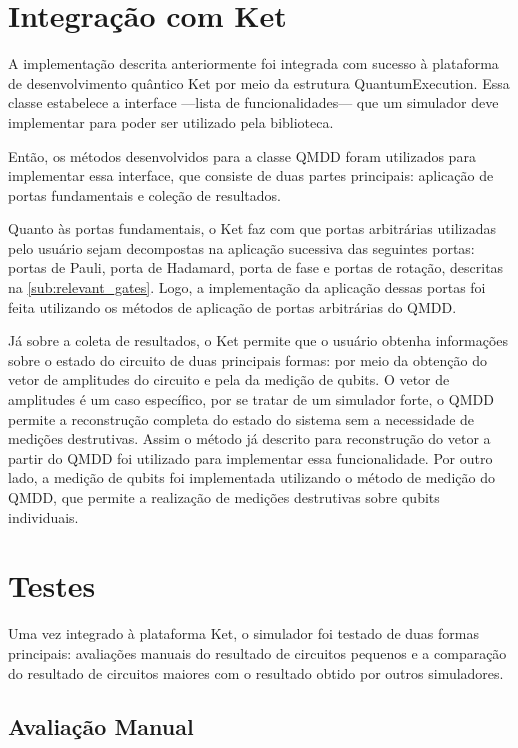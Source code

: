 \section{Integração com Ket}\label{sec:ket}

A implementação descrita anteriormente foi integrada com sucesso à plataforma de desenvolvimento quântico Ket por meio da estrutura QuantumExecution. Essa classe estabelece a interface ---lista de funcionalidades--- que um simulador deve implementar para poder ser utilizado pela biblioteca.

Então, os métodos desenvolvidos para a classe QMDD foram utilizados para implementar essa interface, que consiste de duas partes principais: aplicação de portas fundamentais e coleção de resultados.

Quanto às portas fundamentais, o Ket faz com que portas arbitrárias utilizadas pelo usuário sejam decompostas na aplicação sucessiva das seguintes portas: portas de Pauli, porta de Hadamard, porta de fase e portas de rotação, descritas na \cref{sub:relevant_gates}. Logo, a implementação da aplicação dessas portas foi feita utilizando os métodos de aplicação de portas arbitrárias do QMDD.

Já sobre a coleta de resultados, o Ket permite que o usuário obtenha informações sobre o estado do circuito de duas principais formas: por meio da obtenção do vetor de amplitudes do circuito e pela da medição de qubits. O vetor de amplitudes é um caso específico, por se tratar de um simulador forte, o QMDD permite a reconstrução completa do estado do sistema sem a necessidade de medições destrutivas. Assim o método já descrito para reconstrução do vetor a partir do QMDD foi utilizado para implementar essa funcionalidade. Por outro lado, a medição de qubits foi implementada utilizando o método de medição do QMDD, que permite a realização de medições destrutivas sobre qubits individuais.

\section{Testes}\label{sec:tests}

Uma vez integrado à plataforma Ket, o simulador foi testado de duas formas principais: avaliações manuais do resultado de circuitos pequenos e a comparação do resultado de circuitos maiores com o resultado obtido por outros simuladores.

\subsection{Avaliação Manual}

